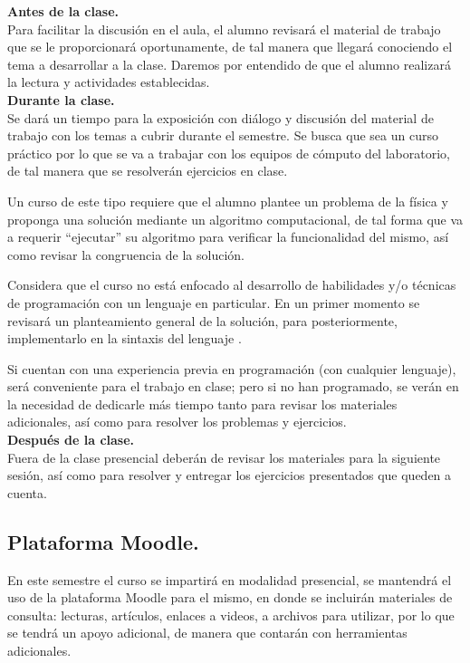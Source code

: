 \noindent
\textbf{Antes de la clase.}
\\
Para facilitar la discusión en el aula, el alumno revisará el material de trabajo que se le proporcionará oportunamente, de tal manera que llegará conociendo el tema a desarrollar a la clase. Daremos por entendido de que el alumno realizará la lectura y actividades establecidas.
\\
\textbf{Durante la clase.}
\\
Se dará un tiempo para la exposición con diálogo y discusión del material de trabajo con los temas a cubrir durante el semestre. Se busca que sea un curso práctico por lo que se va a trabajar con los equipos de cómputo del laboratorio, de tal manera que se resolverán ejercicios en clase.
\par
Un curso de este tipo requiere que el alumno plantee un problema de la física y proponga una solución mediante un algoritmo computacional, de tal forma que va a requerir \enquote{ejecutar} su algoritmo para verificar la funcionalidad del mismo, así como revisar la congruencia de la solución.
\par
Considera que el curso no está enfocado al desarrollo de habilidades y/o técnicas de programación con un lenguaje en particular. En un primer momento se revisará un planteamiento general de la solución, para posteriormente, implementarlo en la sintaxis del lenguaje \python.
\par
Si cuentan con una experiencia previa en programación (con cualquier lenguaje), será conveniente para el trabajo en clase; pero si no han programado, se verán en la necesidad de dedicarle más tiempo tanto para revisar los materiales adicionales, así como para resolver los problemas y ejercicios.
\\
\textbf{Después de la clase.}
\\
Fuera de la clase presencial deberán de revisar los materiales para la siguiente sesión, así como para resolver y entregar los ejercicios presentados que queden a cuenta.

\subsection{Plataforma Moodle.}

En este semestre el curso se impartirá en modalidad presencial, se mantendrá el uso de la plataforma Moodle para el mismo, en donde se incluirán materiales de consulta: lecturas, artículos, enlaces a videos, a archivos para utilizar, por lo que se tendrá un apoyo adicional, de manera que contarán con herramientas adicionales.


